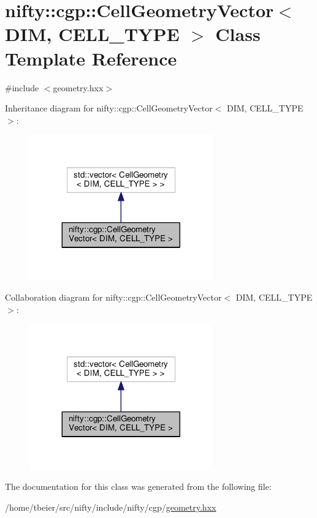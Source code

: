 \hypertarget{classnifty_1_1cgp_1_1CellGeometryVector}{}\section{nifty\+:\+:cgp\+:\+:Cell\+Geometry\+Vector$<$ D\+I\+M, C\+E\+L\+L\+\_\+\+T\+Y\+P\+E $>$ Class Template Reference}
\label{classnifty_1_1cgp_1_1CellGeometryVector}


{\ttfamily \#include $<$geometry.\+hxx$>$}



Inheritance diagram for nifty\+:\+:cgp\+:\+:Cell\+Geometry\+Vector$<$ D\+I\+M, C\+E\+L\+L\+\_\+\+T\+Y\+P\+E $>$\+:\nopagebreak
\begin{figure}[H]
\begin{center}
\leavevmode
\includegraphics[width=224pt]{classnifty_1_1cgp_1_1CellGeometryVector__inherit__graph}
\end{center}
\end{figure}


Collaboration diagram for nifty\+:\+:cgp\+:\+:Cell\+Geometry\+Vector$<$ D\+I\+M, C\+E\+L\+L\+\_\+\+T\+Y\+P\+E $>$\+:\nopagebreak
\begin{figure}[H]
\begin{center}
\leavevmode
\includegraphics[width=224pt]{classnifty_1_1cgp_1_1CellGeometryVector__coll__graph}
\end{center}
\end{figure}


The documentation for this class was generated from the following file\+:\begin{DoxyCompactItemize}
\item 
/home/tbeier/src/nifty/include/nifty/cgp/\hyperlink{geometry_8hxx}{geometry.\+hxx}\end{DoxyCompactItemize}
